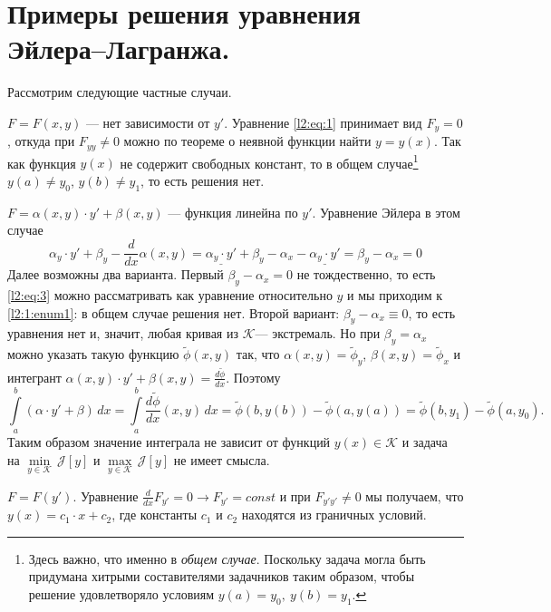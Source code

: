 \documentclass[12pt,a4paper,openany,fleqn]{book}
\newcommand{\J}{\ensuremath{\mathcal{J}}}
\newcommand{\mc}[1]{\ensuremath{\mathcal{#1}}}
\newcommand{\der}[2]{\ensuremath{\frac{d#1}{d#2}}}
\newcommand{\K}{\mc{K}}
\theoremstyle{definition}
\begin{document}
	\section{Примеры решения уравнения Эйлера--Лагранжа.}
	\label{lecture2section1}
	Рассмотрим следующие частные случаи.
	\begin{enumerate1}
		\item \label{l2:1:enum1} $F=F(x,y)$ --- нет зависимости от $y'$. Уравнение \eqref{l2:eq:1} принимает вид $F_y=0$, откуда при $F_{yy}\neq0$ можно по теореме о неявной функции найти $y=y(x)$. Так как функция $y(x)$ не содержит свободных констант, то в общем случае\footnote[1]{Здесь важно, что именно в \emph{общем случае}. Поскольку задача могла быть придумана хитрыми составителями задачников таким образом, чтобы решение удовлетворяло условиям $y(a)=y_0,\  y(b)=y_1$.} $y(a)\neq y_0$, $y(b)\neq y_1$, то есть решения нет. 
		
		\item  $F=\alpha(x,y)\cdot y'+\beta(x,y)$ --- функция линейна по $y'$. Уравнение Эйлера в этом случае
		\begin{equation}
			\label{l2:eq:3}
			\alpha_y\cdot y'+\beta_y-\der{}{x}\alpha(x,y)=\underline{\alpha_y\cdot y'}+\beta_y-\alpha_x-\underline{\alpha_y\cdot y'}=\beta_y-\alpha_x=0
		\end{equation}
		Далее возможны два варианта. Первый $\beta_y-\alpha_x=0$ не тождественно, то есть \eqref{l2:eq:3} можно рассматривать как уравнение относительно $y$ и мы приходим к \ref{l2:1:enum1}: в общем случае решения нет. 
		\noindent Второй вариант: $\beta_y-\alpha_x\equiv0$, то есть уравнения нет и, значит, любая кривая из \K --- экстремаль. Но при $\beta_y=\alpha_x$ можно указать такую функцию $\widetilde{\phi}(x,y)$ так, что $\alpha(x,y)=\widetilde{\phi}_y$, $\beta(x,y)=\widetilde{\phi}_x$ и интегрант $\alpha(x,y)\cdot y'+\beta(x,y)=\displaystyle\der{\widetilde{\phi}}{x}$. Поэтому 
		\begin{equation*}
			\int\limits_a^b(\alpha\cdot y'+\beta)\,dx=\int\limits_a^b\der{\widetilde{\phi}}{x}(x,y)\,dx=\widetilde{\phi}(b,y(b))-\widetilde{\phi}(a,y(a))=\widetilde{\phi}(b,y_1)-\widetilde{\phi}(a,y_0).
		\end{equation*}
		Таким образом значение интеграла не зависит от функций $y(x)\in\K$ и задача на $\min\limits_{y\in\K}\,\J[y]$ и $\max\limits_{y\in\K}\,\J[y]$ не имеет смысла.
		
		\item $F=F(y')$. Уравнение $\der{}{x}F_{y'}=0\rightarrow F_{y'}=const$ и при $F_{y'y'}\neq0$ мы получаем, что $y(x)=c_1\cdot x+c_2$, где константы $c_1$ и $c_2$ находятся из граничных условий.
		

\end{enumerate1}
\end{document}
